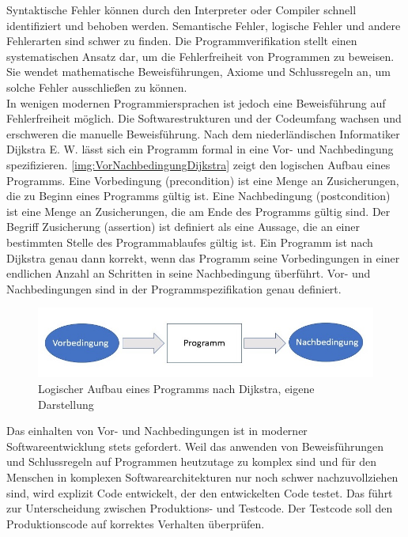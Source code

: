 \documentclass[a4paper,titlepage,halfparskip,12pt]{scrreprt}
\begin{document}
\begin{onehalfspacing}
Syntaktische Fehler können durch den Interpreter oder Compiler schnell identifiziert und behoben werden. Semantische Fehler, logische Fehler und andere Fehlerarten sind schwer zu finden. Die Programmverifikation stellt einen systematischen Ansatz dar, um die Fehlerfreiheit von Programmen zu beweisen. Sie wendet mathematische Beweisführungen, Axiome und Schlussregeln an, um solche Fehler ausschließen zu können.\\
In wenigen modernen Programmiersprachen ist jedoch eine Beweisführung auf Fehlerfreiheit möglich. Die Softwarestrukturen und der Codeumfang wachsen und erschweren die manuelle Beweisführung. Nach dem niederländischen Informatiker Dijkstra E. W. lässt sich ein Programm formal in eine Vor- und Nachbedingung spezifizieren. \autoref{img:VorNachbedingungDijkstra} zeigt den logischen Aufbau eines Programms. Eine Vorbedingung (precondition) ist eine Menge an Zusicherungen, die zu Beginn eines Programms gültig ist. Eine Nachbedingung (postcondition) ist eine Menge an Zusicherungen, die am Ende des Programms gültig sind. Der Begriff Zusicherung (assertion) ist definiert als eine Aussage, die an einer bestimmten Stelle des Programmablaufes gültig ist. Ein Programm ist nach Dijkstra genau dann korrekt, wenn das Programm seine Vorbedingungen in einer endlichen Anzahl an Schritten in seine Nachbedingung überführt. Vor- und Nachbedingungen sind in der Programmspezifikation genau definiert.\cite{kirchner2017}

\begin{figure}[h]
	\centering
	\includegraphics[width=\textwidth]{images/VorNachbedingungDijkstra}
	\caption{Logischer Aufbau eines Programms nach Dijkstra, eigene Darstellung}
	\label{img:VorNachbedingungDijkstra}
\end{figure}

Das einhalten von Vor- und Nachbedingungen ist in moderner Softwareentwicklung stets gefordert. Weil das anwenden von Beweisführungen und Schlussregeln auf Programmen heutzutage zu komplex sind und für den Menschen in komplexen Softwarearchitekturen nur noch schwer nachzuvollziehen sind, wird explizit Code entwickelt, der den entwickelten Code testet. Das führt zur Unterscheidung zwischen Produktions- und Testcode. Der Testcode soll den Produktionscode auf korrektes Verhalten überprüfen.\cite{kirchner2017}


\end{onehalfspacing}
\end{document}
